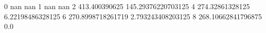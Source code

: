 0 nan nan
1 nan nan
2 413.400390625 145.29376220703125
4 274.32861328125 6.22198486328125
6 270.8998718261719 2.793243408203125
8 268.10662841796875 0.0
